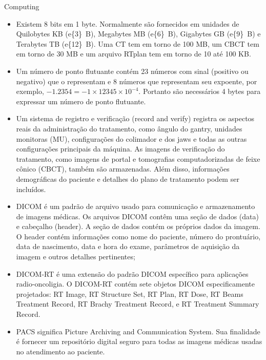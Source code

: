\documentclass[11pt,a4paper]{article}
\newcounter{exemplo}
\begin{document}
\begin{exemplo}
\begin{itemize}
    \end{itemize}

    \textcolor{CarnationPink}{Computing}
    \begin{itemize}
        \item Existem 8 bits em 1 byte. Normalmente são fornecidos em unidades de Quilobytes KB (\qty{e{3}}{B}), Megabytes MB (\qty{e{6}}{B}), Gigabytes GB (\qty{e{9}}{B}) e Terabytes TB (\qty{e{12}}{B}). Uma CT tem em torno de 100 MB, um CBCT tem em torno de 30 MB e um arquivo RTplan tem em torno de 10 até 100 KB.
        
        \item Um número de ponto flutuante contém 23 números com sinal (positivo ou negativo)  que o representam e 8 números que representam seu expoente, por exemplo, $-1.2354 = -1 \times 12345 \times 10^{-4}$. Portanto são necessários 4 bytes para expressar um número de ponto flutuante.
        
        \item Um sistema de registro e verificação (record and verify) registra os aspectos reais da administração do tratamento, como ângulo do gantry, unidades monitoras (MU), configurações do colimador e dos jaws e todas as outras configurações principais da máquina. As imagens de verificação do tratamento, como imagens de portal e tomografias computadorizadas de feixe cônico (CBCT), também são armazenadas. Além disso, informações demográficas do paciente e detalhes do plano de tratamento podem ser incluídos.
        
        \item DICOM é um padrão de arquivo usado para comunicação e armazenamento de imagens médicas. Os arquivos DICOM contêm uma seção de dados (data) e cabeçalho (header). A seção de dados contém os próprios dados da imagem. O header contém informações como nome do paciente, número do prontuário, data de nascimento, data e hora do exame, parâmetros de aquisição da imagem e outros detalhes pertinentes;
        
        \item DICOM-RT é uma extensão do padrão DICOM específico para aplicações radio-oncoligia. O DICOM-RT contém sete objetos DICOM especificamente projetados: RT Image, RT Structure Set, RT Plan, RT Dose, RT Beams Treatment Record, RT Brachy Treatment Record, e RT Treatment Summary Record.
        
        \item PACS significa Picture Archiving and Communication System. Sua finalidade é fornecer um repositório digital seguro para todas as imagens médicas usadas no atendimento ao paciente.

    \end{itemize}

\end{exemplo}
\end{document}
